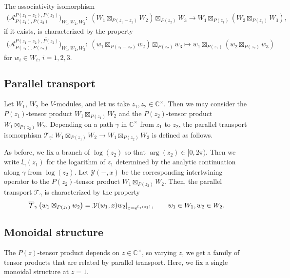 \documentclass[pdftex]{sigma}
\numberwithin{equation}{section}
\newcommand{\ol}[1]{\overline{#1}}
\newcommand{\bC}{\mathbb{C}}
\newcommand{\cA}{\mathcal{A}}
\newcommand{\cT}{\mathcal{T}}
\newcommand{\voagen}{V}
\newcommand{\voamodgen}{W}
\newcommand{\voaint}{\mathcal{Y}}
\newcommand{\vmodvec}{w}
\begin{document}
The associativity isomorphism
\begin{gather*}
 \big(\cA_{P(z_{1}),P(z_{2})}^{P(z_{1}-z_{2}),P(z_{2})}\big)_{\voamodgen_{1},\voamodgen_{2},\voamodgen_{3}}\colon\
 (\voamodgen_{1}\boxtimes_{P(z_{1}-z_{2})}\voamodgen_{2})\boxtimes_{P(z_{2})}\voamodgen_{3}\to
 \voamodgen_{1}\boxtimes_{P(z_{1})}(\voamodgen_{2}\boxtimes_{P(z_{2})}\voamodgen_{3}),
\end{gather*}
if it exists, is characterized by the property
\begin{gather*}
 \ol{\big(\cA_{P(z_{1}),P(z_{2})}^{P(z_{1}-z_{2}),P(z_{2})}\big)_{\voamodgen_{1},\voamodgen_{2},\voamodgen_{3}}}\colon\
 (\vmodvec_{1}\boxtimes_{P(z_{1}-z_{2})}\vmodvec_{2})\boxtimes_{P(z_{2})}\vmodvec_{3} \mapsto
 \vmodvec_{1}\boxtimes_{P(z_{1})}(\vmodvec_{2}\boxtimes_{P(z_{2})}\vmodvec_{3})
\end{gather*}
for $\vmodvec_{i}\in \voamodgen_{i}$, $i=1,2,3$.

\subsection{Parallel transport}
Let $\voamodgen_{1}$, $\voamodgen_{2}$ be $\voagen$-modules,
and let us take $z_{1},z_{2}\in\bC^{\times}$.
Then we may consider the $P(z_{1})$-tensor product $\voamodgen_{1}\boxtimes_{P(z_{1})}\voamodgen_{2}$ and the $P(z_{2})$-tensor product $\voamodgen_{1}\boxtimes_{P(z_{2})}\voamodgen_{2}$.
Depending on a path $\gamma$ in $\bC^{\times}$ from $z_{1}$ to $z_{2}$,
the parallel transport isomorphism $\cT_{\gamma}\colon \voamodgen_{1}\boxtimes_{P(z_{1})}\voamodgen_{2}\to \voamodgen_{1}\boxtimes_{P(z_{2})}\voamodgen_{2}$ is defined as follows.


As before, we fix a branch of $\log (z_{2})$ so that $\arg (z_{2})\in [0,2\pi)$.
Then we write $l_{\gamma}(z_{1})$ for the logarithm of $z_{1}$ determined by the analytic continuation along $\gamma$ from $\log (z_{2})$.
Let $\voaint (-,x)$ be the corresponding intertwining operator to the $P(z_{2})$-tensor product $\voamodgen_{1}\boxtimes_{P(z_{2})}\voamodgen_{2}$.
Then, the parallel transport $\cT_{\gamma}$ is characterized by the property
\begin{gather*}
 \ol{\cT}_{\gamma}\left(\vmodvec_{1}\boxtimes_{P(z_{1})}\vmodvec_{2}\right)=\voaint(\vmodvec_{1},x)\vmodvec_{2}|_{x={\rm e}^{l_{\gamma}(z_{1})}},\qquad \vmodvec_{1}\in\voamodgen_{1}, \vmodvec_{2}\in\voamodgen_{2}.
\end{gather*}

\subsection{Monoidal structure}
The $P(z)$-tensor product depends on $z\in \bC^{\times}$, so varying $z$, we get a family of tensor products that are related by parallel transport.
Here, we fix a single monoidal structure at $z=1$.
\end{document}
